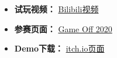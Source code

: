 \begin{itemize}
    \item \textbf{试玩视频：} \href{https://www.bilibili.com/video/BV1U24y137PN/?vd_source=ead0ac501dfae814e19fd7d9f376d92d}{Bilibili视频}
    \item \textbf{参赛页面：} \href{https://itch.io/jam/game-off-2020/rate/839864}{Game Off 2020}
    \item \textbf{Demo下载：} \href{https://scyq.itch.io/shoot-the-moon}{itch.io页面}
\end{itemize}
